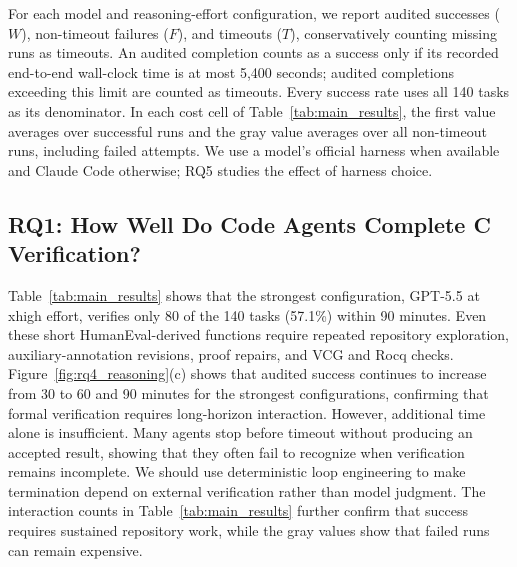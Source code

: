 For each model and reasoning-effort configuration, we report audited successes ($W$), non-timeout failures ($F$), and timeouts ($T$), conservatively counting missing runs as timeouts. An audited completion counts as a success only if its recorded end-to-end wall-clock time is at most 5,400 seconds; audited completions exceeding this limit are counted as timeouts. Every success rate uses all 140 tasks as its denominator. In each cost cell of Table~\ref{tab:main_results}, the first value averages over successful runs and the gray value averages over all non-timeout runs, including failed attempts. We use a model's official harness when available and Claude Code otherwise; RQ5 studies the effect of harness choice.

\subsection{RQ1: How Well Do Code Agents Complete C Verification?}
Table~\ref{tab:main_results} shows that the strongest configuration, GPT-5.5 at xhigh effort, verifies only 80 of the 140 tasks (57.1\%) within 90 minutes. Even these short HumanEval-derived functions require repeated repository exploration, auxiliary-annotation revisions, proof repairs, and VCG and Rocq checks. Figure~\ref{fig:rq4_reasoning}(c) shows that audited success continues to increase from 30 to 60 and 90 minutes for the strongest configurations, confirming that formal verification requires long-horizon interaction. However, additional time alone is insufficient. Many agents stop before timeout without producing an accepted result, showing that they often fail to recognize when verification remains incomplete. We should use deterministic loop engineering to make termination depend on external verification rather than model judgment. The interaction counts in Table~\ref{tab:main_results} further confirm that success requires sustained repository work, while the gray values show that failed runs can remain expensive.


